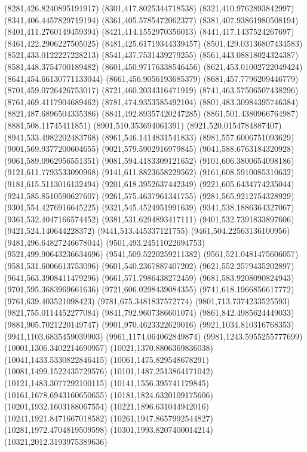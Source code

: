 {(8281,426.8240895191917)
(8301,417.8025344718538)
(8321,410.9762893842997)
(8341,406.4457829719194)
(8361,405.5785472062377)
(8381,407.93861980508194)
(8401,411.2760149459394)
(8421,414.1552970356013)
(8441,417.1437524267697)
(8461,422.2906227505025)
(8481,425.61719344339457)
(8501,429.03136807434583)
(8521,433.0122227228213)
(8541,437.7531439279255)
(8561,443.08818024324387)
(8581,448.3754700189482)
(8601,450.97176338546456)
(8621,453.01002722049424)
(8641,454.66130771133044)
(8661,456.9056193685379)
(8681,457.7796209446779)
(8701,459.0726426753017)
(8721,460.2034316471919)
(8741,463.57506507438296)
(8761,469.4117904689462)
(8781,474.9353585492104)
(8801,483.30984395746384)
(8821,487.6896504335386)
(8841,492.89357420247285)
(8861,501.4380966764987)
(8881,508.11745411851)
(8901,510.353694061391)
(8921,520.0154784887407)
(8941,533.4982202483768)
(8961,546.1414831541833)
(8981,557.6006751093629)
(9001,569.9377200604655)
(9021,579.5902916979845)
(9041,588.6763184320928)
(9061,589.0962956551351)
(9081,594.4183309121652)
(9101,606.3800654098186)
(9121,611.7793533090968)
(9141,611.8823658229562)
(9161,608.5910085310632)
(9181,615.5113016132494)
(9201,618.3952637442349)
(9221,605.6434774235044)
(9241,585.8510590627607)
(9261,575.4637961341755)
(9281,565.9212754328929)
(9301,554.4276916645225)
(9321,545.4524951991639)
(9341,538.1886364327067)
(9361,532.4047166574452)
(9381,531.6294893417111)
(9401,532.7391833897606)
(9421,524.140644228372)
(9441,513.445337121755)
(9461,504.22563136100956)
(9481,496.64827246678044)
(9501,493.24511022694753)
(9521,499.90643236634696)
(9541,509.5220259211382)
(9561,521.0481475606057)
(9581,531.6006613753096)
(9601,540.2367887407202)
(9621,552.2579435202897)
(9641,563.3908411479296)
(9661,571.7986438272459)
(9681,583.9208090824943)
(9701,595.3683969661636)
(9721,606.0298439084355)
(9741,618.1966856617772)
(9761,639.403521098423)
(9781,675.3481837572774)
(9801,713.7374233525593)
(9821,755.0114452277084)
(9841,792.9607386601074)
(9861,842.4985624449033)
(9881,905.7021220149747)
(9901,970.4623322629016)
(9921,1034.810316768353)
(9941,1103.6835459039903)
(9961,1174.064062849874)
(9981,1243.5955255777699)
(10001,1306.3402214690957)
(10021,1370.8806369836038)
(10041,1433.5330822846415)
(10061,1475.829548678291)
(10081,1499.1522435729576)
(10101,1487.2513864171042)
(10121,1483.3077292100115)
(10141,1556.395741179845)
(10161,1678.6943160650655)
(10181,1824.6320109175606)
(10201,1932.1603188067554)
(10221,1896.631044942016)
(10241,1921.8471667018582)
(10261,1947.8657992544827)
(10281,1972.4704819509598)
(10301,1993.8207400014214)
(10321,2012.3193975389636)
}
